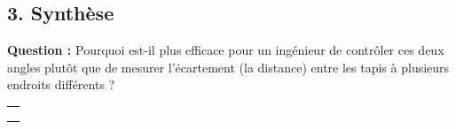 \documentclass[a4paper]{book}
\begin{document}
\begin{exercice}
        \subsection*{3. Synthèse}
        \textbf{Question :} Pourquoi est-il plus efficace pour un ingénieur de contrôler ces deux angles plutôt que de mesurer l'écartement (la distance) entre les tapis à plusieurs endroits différents ?
        
       \begin{tabular}{|p{16cm}|}
            \hline \\ \\ \\ \hline            
        \end{tabular}
        
        \vfill
    \end{exercice}  
\end{document}
